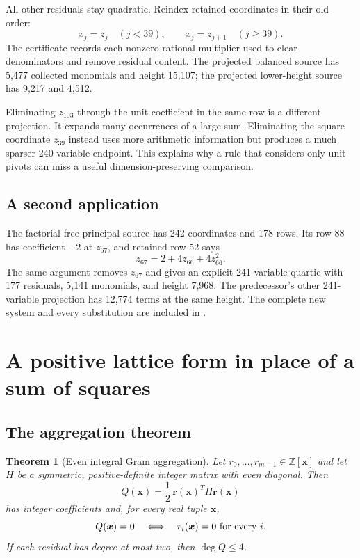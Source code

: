 \documentclass[11pt]{article}
\newtheorem{theorem}{Theorem}[section]
\theoremstyle{remark}\newtheorem{remark}[theorem]{Remark}
\newcommand{\Z}{\mathbb Z}
\newcommand{\code}[1]{\texttt{\detokenize{#1}}}
\begin{document}
All other residuals stay quadratic. Reindex retained coordinates in their
old order:
\[
x_j=z_j\quad(j<39),\qquad x_j=z_{j+1}\quad(j\ge39).
\]
The certificate records each nonzero rational multiplier used to clear
denominators and remove residual content. The projected balanced source
has 5,477 collected monomials and height 15,107; the projected lower-height
source has 9,217 and 4,512.

Eliminating $z_{103}$ through the unit coefficient in the same row is a
different projection. It expands many occurrences of a large sum.
Eliminating the square coordinate $z_{39}$ instead uses more arithmetic
information but produces a much sparser 240-variable endpoint.
This explains why a rule that considers only unit pivots can miss a
useful dimension-preserving comparison.

\subsection{A second application}

The factorial-free principal source has 242 coordinates and 178 rows.
Its row 88 has coefficient $-2$ at $z_{67}$, and retained row 52 says
\[
z_{67}=2+4z_{66}+4z_{66}^2.
\]
The same argument removes $z_{67}$ and gives an explicit 241-variable
quartic with 177 residuals, 5,141 monomials, and height 7,968.
The predecessor's other 241-variable projection has 12,774 terms at
the same height. The complete new system and every substitution are
included in \code{projection/factorialfree241/}.

\section{A positive lattice form in place of a sum of squares}\label{sec:gram}

\subsection{The aggregation theorem}

\begin{theorem}[Even integral Gram aggregation]\label{thm:gram}
Let $r_0,\ldots,r_{m-1}\in\Z[\boldsymbol x]$ and let $H$ be a symmetric,
positive-definite integer matrix with even diagonal. Then
\[
Q(\boldsymbol x)=\frac12\,\boldsymbol r(\boldsymbol x)^T
H\boldsymbol r(\boldsymbol x)
\]
has integer coefficients and, for every real tuple $\boldsymbol x$,
\[
Q(\boldsymbol x)=0
\quad\Longleftrightarrow\quad
r_i(\boldsymbol x)=0\ \hbox{for every }i.
\]
If each residual has degree at most two, then $\deg Q\le4$.
\end{theorem}
\end{document}
